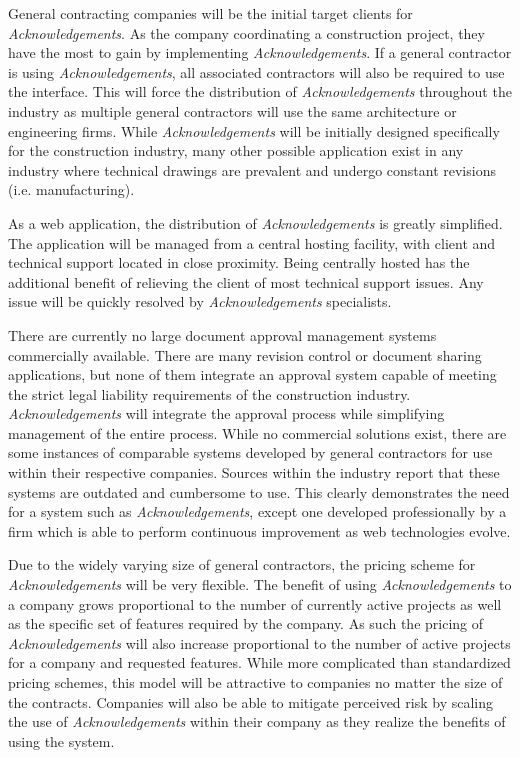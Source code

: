General contracting companies will be the initial target clients for {\it Acknowledgements}. As the company coordinating a construction project, they have the most to gain by implementing {\it Acknowledgements}. If a general contractor is using {\it Acknowledgements}, all associated contractors will also be required to use the interface. This will force the distribution of {\it Acknowledgements} throughout the industry as multiple general contractors will use the same architecture or engineering firms. While {\it Acknowledgements} will be initially designed specifically for the construction industry, many other possible application exist in any industry where technical drawings are prevalent and undergo constant revisions (i.e. manufacturing). 

As a web application, the distribution of {\it Acknowledgements} is greatly simplified. The application will be managed from a central hosting facility, with client and technical support located in close proximity. Being centrally hosted has the additional benefit of relieving the client of most technical support issues. Any issue will be quickly resolved by {\it Acknowledgements} specialists.

There are currently no large document approval management systems commercially available. There are many revision control or document sharing applications, but none of them integrate an approval system capable of meeting the strict legal liability requirements of the construction industry. {\it Acknowledgements} will integrate the approval process while simplifying management of the entire process. While no commercial solutions exist, there are some instances of comparable systems developed by general contractors for use within their respective companies. Sources within the industry report that these systems are outdated and cumbersome to use. This clearly demonstrates the need for a system such as {\it Acknowledgements}, except one developed professionally by a firm which is able to perform continuous improvement as web technologies evolve.

Due to the widely varying size of general contractors, the pricing scheme for {\it Acknowledgements} will be very flexible. The benefit of using {\it Acknowledgements} to a company grows proportional to the number of currently active projects as well as the specific set of features required by the company. As such the pricing of {\it Acknowledgements} will also increase proportional to the number of active projects for a company and requested features. While more complicated than standardized pricing schemes, this model will be attractive to companies no matter the size of the contracts. Companies will also be able to mitigate perceived risk by scaling the use of {\it Acknowledgements} within their company as they realize the benefits of using the system.

